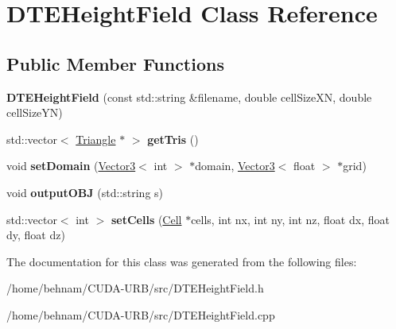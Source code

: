 \hypertarget{classDTEHeightField}{}\section{D\+T\+E\+Height\+Field Class Reference}
\label{classDTEHeightField}
\subsection*{Public Member Functions}
\begin{DoxyCompactItemize}
\item 
\mbox{\label{classDTEHeightField_aebd33cfb7c7ce087e341ceecea15a358}} 
{\bfseries D\+T\+E\+Height\+Field} (const std\+::string \&filename, double cell\+Size\+XN, double cell\+Size\+YN)
\item 
\mbox{\label{classDTEHeightField_a167ff2b1b9e969f04f2269b268ca7ba5}} 
std\+::vector$<$ \hyperlink{classTriangle}{Triangle} $\ast$ $>$ {\bfseries get\+Tris} ()
\item 
\mbox{\label{classDTEHeightField_a5890b28c0c907972103e8e0317455800}} 
void {\bfseries set\+Domain} (\hyperlink{classVector3}{Vector3}$<$ int $>$ $\ast$domain, \hyperlink{classVector3}{Vector3}$<$ float $>$ $\ast$grid)
\item 
\mbox{\label{classDTEHeightField_a39ebb3ac406dadfa20d010cd9f015131}} 
void {\bfseries output\+O\+BJ} (std\+::string s)
\item 
\mbox{\label{classDTEHeightField_ae8c7ad231888af85cbe4e4bb19dd5474}} 
std\+::vector$<$ int $>$ {\bfseries set\+Cells} (\hyperlink{classCell}{Cell} $\ast$cells, int nx, int ny, int nz, float dx, float dy, float dz)
\end{DoxyCompactItemize}


The documentation for this class was generated from the following files\+:\begin{DoxyCompactItemize}
\item 
/home/behnam/\+C\+U\+D\+A-\/\+U\+R\+B/src/D\+T\+E\+Height\+Field.\+h\item 
/home/behnam/\+C\+U\+D\+A-\/\+U\+R\+B/src/D\+T\+E\+Height\+Field.\+cpp\end{DoxyCompactItemize}
